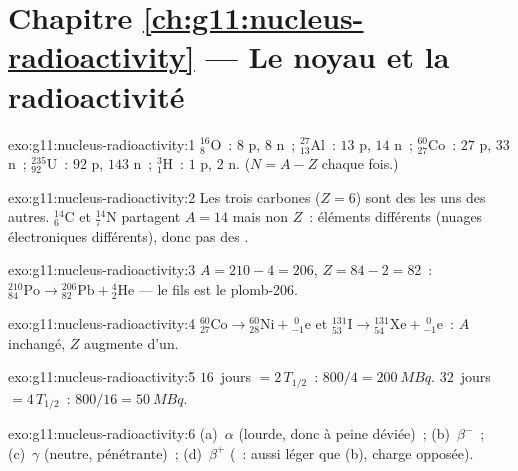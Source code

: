 \section*{Chapitre \ref{ch:g11:nucleus-radioactivity} --- Le noyau et la radioactivité}

\begin{solution}{exo:g11:nucleus-radioactivity:1}
${}^{16}_{8}\mathrm{O}$~: $8$ p, $8$ n~; ${}^{27}_{13}\mathrm{Al}$~: $13$ p,
$14$ n~; ${}^{60}_{27}\mathrm{Co}$~: $27$ p, $33$ n~;
${}^{235}_{92}\mathrm{U}$~: $92$ p, $143$ n~; ${}^{3}_{1}\mathrm{H}$~: $1$ p,
$2$ n. ($N = A - Z$ chaque fois.)
\end{solution}

\begin{solution}{exo:g11:nucleus-radioactivity:2}
Les trois carbones ($Z = 6$) sont des
 les uns des autres.
${}^{14}_{6}\mathrm{C}$ et ${}^{14}_{7}\mathrm{N}$ partagent $A = 14$
mais non $Z$~: éléments différents (nuages électroniques différents),
donc pas des .
\end{solution}

\begin{solution}{exo:g11:nucleus-radioactivity:3}
$A = 210 - 4 = 206$, $Z = 84 - 2 = 82$~:
${}^{210}_{84}\mathrm{Po} \to {}^{206}_{82}\mathrm{Pb} +
{}^{4}_{2}\mathrm{He}$ --- le  fils est le plomb-206.
\end{solution}

\begin{solution}{exo:g11:nucleus-radioactivity:4}
${}^{60}_{27}\mathrm{Co} \to {}^{60}_{28}\mathrm{Ni} +
{}^{\;0}_{-1}\mathrm{e}$ et
${}^{131}_{53}\mathrm{I} \to {}^{131}_{54}\mathrm{Xe} +
{}^{\;0}_{-1}\mathrm{e}$~: $A$ inchangé, $Z$ augmente d'un.
\end{solution}

\begin{solution}{exo:g11:nucleus-radioactivity:5}
$16$~jours $= 2\,T_{1/2}$~: $800/4 = \qty{200}{MBq}$. $32$~jours
$= 4\,T_{1/2}$~: $800/16 = \qty{50}{MBq}$.
\end{solution}

\begin{solution}{exo:g11:nucleus-radioactivity:6}
(a)~$\alpha$ (lourde, donc à peine déviée)~; (b)~$\beta^-$~; (c)~$\gamma$
(neutre, pénétrante)~; (d)~$\beta^+$
(~: aussi léger que
(b), charge opposée).
\end{solution}

